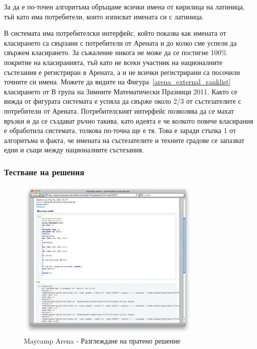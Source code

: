 \documentclass[a4paper,12pt]{article}
\begin{document}
  За да е по-точен алгоритъма обръщаме всички имена от кирилица на латиница, тъй като има потребители, които изписват имената си с латиница.
  
  В системата има потребителски интерфейс, който показва как имената от класирането са свързани с потребители от Арената и до колко сме успели да свържем класирането. За съжаление никога не може да се постигне 100\% покритие на класиранията, тъй като не всеки участник на националните състезания е регистриран в Арената, а и не всички регистрирани са посочили точните си имена. Можете да видите на Фигура~\ref{arena_external_ranklist} класирането от В група на Зимните Математически Празници 2011. Както се вижда от фигурата системата е успяла да свърже около 2/3 от състезателите с потребители от Арената. Потребителският интерфейс позволява да се махат връзки и да се създават ръчно такива, като идеята е че колкото повече класирания е обработила системата, толкова по-точна ще е тя. Това е заради стъпка 1 от алгоритъма и факта, че имената на състезателите и техните градове се запазват едни и същи между националните състезания.
  
  \subsubsection{Тестване на решения}

  \begin{figure}[ht]
    \begin{center}
      \includegraphics[width=0.8\textwidth]{images/maycamp_arena_admin_run.png}
    \end{center}
    \caption{Maycamp Arena - Разглеждане на пратено решение}
    \label{arena_external_run}
  \end{figure}
  
\end{document}
